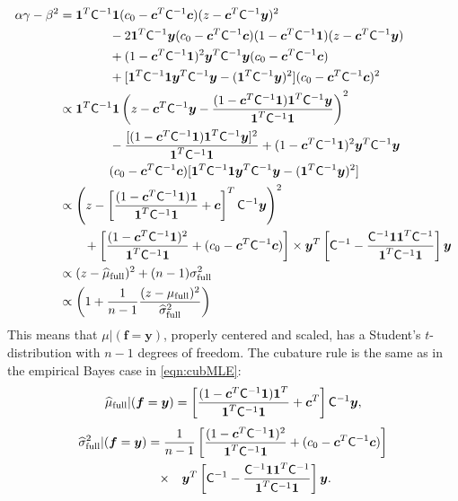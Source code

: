 \documentclass[twocolumn]{svjour3}          %
\newcommand{\bm}[1]{\boldsymbol{#1}}
\newcommand{\vc}{\bm{c}}
\newcommand{\vf}{\bm{f}}
\newcommand{\vy}{\bm{y}}
\newcommand{\vone}{\bm{1}}
\newcommand{\mC}{\mathsf{C}}
\begin{document}
\begin{align*}
\alpha \gamma - \beta^2 
& = \vone^T \mC^{-1} \vone (c_0  -\vc ^T \mC^{-1} \vc) (z - \vc^T \mC^{-1} \vy )^2 \\
& \qquad \qquad - 2 \vone^T \mC^{-1} \vy (c_0  -\vc ^T \mC^{-1} \vc)(1 - \vc^T \mC^{-1} \vone)(z - \vc^T \mC^{-1} \vy ) \\
& \qquad \qquad + (1 - \vc^T \mC^{-1} \vone)^2 \vy^T \mC^{-1} \vy (c_0  -\vc ^T \mC^{-1} \vc) \\
&\qquad \qquad  + [\vone^T \mC^{-1} \vone \vy^T \mC^{-1} \vy - (\vone^T \mC^{-1} \vy)^2](c_0  -\vc ^T \mC^{-1} \vc)^2  \\
& \propto \vone^T \mC^{-1} \vone  \left (z - \vc^T \mC^{-1} \vy - \frac{(1 - \vc^T \mC^{-1} \vone)\vone^T \mC^{-1} \vy}{\vone^T \mC^{-1} \vone } \right )^2 \\
& \qquad \qquad -  \frac{[(1 - \vc^T \mC^{-1} \vone)\vone^T \mC^{-1} \vy]^2}{\vone^T \mC^{-1} \vone }  
+ (1 - \vc^T \mC^{-1} \vone)^2 \vy^T \mC^{-1} \vy \\
& \qquad \qquad (c_0  -\vc ^T \mC^{-1} \vc) [\vone^T \mC^{-1} \vone  \vy^T \mC^{-1} \vy
- (\vone^T \mC^{-1} \vy)^2] \\
& \propto \left (z - \left[ \frac{(1 - \vc^T \mC^{-1} \vone)\vone}{\vone^T \mC^{-1} \vone } + \vc \right]^T \mC^{-1} \vy \right )^2 \\
& \qquad  + \left[\frac{(1 - \vc^T \mC^{-1} \vone)^2}{\vone^T \mC^{-1} \vone} + (c_0  -\vc ^T \mC^{-1} \vc) \right] \times \vy^T\left[ \mC^{-1} 
- \frac{ \mC^{-1} \vone\vone^T \mC^{-1}}{\vone^T \mC^{-1} \vone}  \right]\vy
\\
& \propto (z - \widehat{\mu}_{\textup{full}})^2 + (n-1) \sigma_{\textup{full}}^2
\\
& \propto \left(1 +  \frac{1}{n-1} \frac{(z - \mu_{\textup{full}})^2}{\widehat{\sigma}_{\textup{full}}^2} \right)
\end{align*}
This means that $\mu \vert (\vf = \vy )$, properly centered and scaled, has a Student's $t$-distribution with $n-1$ degrees of freedom. The cubature rule is the same as in the empirical Bayes case in \eqref{eqn:cubMLE}:
\begin{gather}\label{FJH:eq:cubFull}
\widehat{\mu}_{\textup{full}}  \vert ( \vf = \vy) = \left[\frac{(1 -  \vc^T \mC^{-1}\vone)\vone^T}{\vone^T \mC^{-1} \vone} + \vc^T \right] \mC^{-1}  \vy,
\end{gather}
\begin{multline}
\label{FJH:eq:signmaFull}
\widehat{\sigma}^2_{\textup{full}}  \vert ( \vf = \vy)  
= \frac{1}{n-1}
\left[\frac{(1 - \vc^T \mC^{-1} \vone)^2}{\vone^T \mC^{-1} \vone} + (c_0  -\vc ^T \mC^{-1} \vc) \right] 
\\
\nonumber
\qquad \times \quad \vy^T\left[ \mC^{-1} 
- \frac{ \mC^{-1} \vone\vone^T \mC^{-1}}{\vone^T \mC^{-1} \vone}  \right]\vy .
\end{multline}
\end{document}
